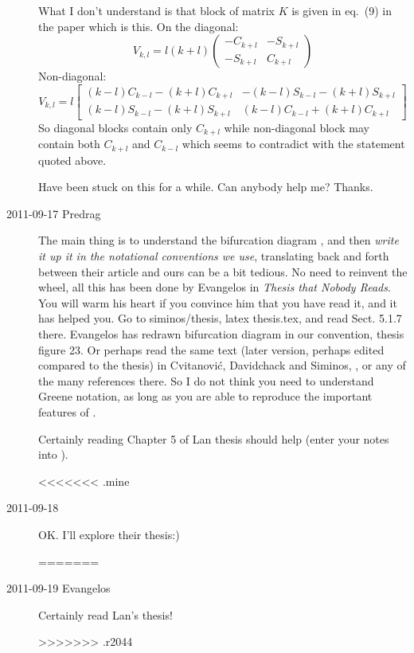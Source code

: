 \begin{description}
What I don't understand is that block of matrix $K$ is given in eq.~(9) in
the paper which is this. On the diagonal:
\[
V_{k,l}
=
l(k+l)
\left(
\begin{array}{cc}
-C_{k+l}   &  -S_{k+l}\\
-S_{k+l}   &   C_{k+l}
\end{array}
\right)
\]
Non-diagonal:
\[
V_{k,l}
=
l
\left[
\begin{array}{cc}
(k-l)C_{k-l}-(k+l)C_{k+l}   &  -(k-l)S_{k-l}-(k+l)S_{k+l}\\
(k-l)S_{k-l}-(k+l)S_{k+l}   &   (k-l)C_{k-l}+(k+l)C_{k+l}
\end{array}
\right]
\]
So diagonal blocks contain only $C_{k+l}$ while non-diagonal block may
contain both $C_{k+l}$ and $C_{k-l}$ which seems to contradict with the
statement quoted above.

Have been stuck on this for a while. Can anybody help me? Thanks.


\item[2011-09-17 Predrag] The main thing is to understand the bifurcation
diagram , and then \emph{write it up it in the
notational conventions we use}, translating back and forth between their
article and ours can be a bit tedious. No need to reinvent the wheel, all
this has been done by Evangelos in
\emph{
           {Thesis that Nobody Reads}}.
You will warm his heart if you convince him that you have read it, and it
has helped you. Go to siminos/thesis, latex thesis.tex, and read Sect.
5.1.7 there. Evangelos has redrawn bifurcation diagram
 in our convention, thesis figure 23. Or perhaps
read the same text (later version, perhaps edited compared to the thesis)
in Cvitanovi{\'c}, Davidchack and Siminos, ,
or any of the many references there. So I do not think you need to
understand Greene notation, as long as you are able to reproduce the
important features of .

Certainly reading Chapter 5 of  Lan thesis
should help (enter your notes into ).

<<<<<<< .mine
\item[2011-09-18] OK. I'll explore their thesis:)

=======
\item[2011-09-19 Evangelos] Certainly read Lan's thesis! 

>>>>>>> .r2044
\end{description}

